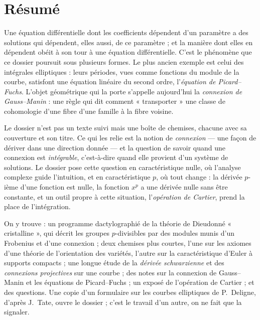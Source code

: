 \documentclass[11pt,a4paper]{article}
\begin{document}
\section*{Résumé}

\begin{resume}
Une équation différentielle dont les coefficients dépendent d'un paramètre a
des solutions qui dépendent, elles aussi, de ce paramètre ; et la manière dont
elles en dépendent obéit à son tour à une équation différentielle. C'est le
phénomène que ce dossier poursuit sous plusieurs formes. Le plus ancien
exemple est celui des intégrales elliptiques : leurs périodes, vues comme
fonctions du module de la courbe, satisfont une équation linéaire du second
ordre, l'\emph{équation de Picard--Fuchs}. L'objet géométrique qui la porte
s'appelle aujourd'hui la \emph{connexion de Gauss--Manin} : une règle qui dit
comment « transporter » une classe de cohomologie d'une fibre d'une famille à
la fibre voisine.

Le dossier n'est pas un texte suivi mais une boîte de chemises, chacune avec
sa couverture et son titre. Ce qui les relie est la notion de
\emph{connexion} — une façon de dériver dans une direction donnée — et la
question de savoir quand une connexion est \emph{intégrable}, c'est-à-dire
quand elle provient d'un système de solutions. Le dossier pose cette question
en caractéristique nulle, où l'analyse complexe guide l'intuition, et en
caractéristique $p$, où tout change : la dérivée $p$-ième d'une fonction est
nulle, la fonction $x^p$ a une dérivée nulle sans être constante, et un
outil propre à cette situation, l'\emph{opération de Cartier}, prend la place
de l'intégration.

On y trouve : un programme dactylographié de la
théorie de Dieudonné « cristalline », qui décrit les groupes $p$-divisibles
par des modules munis d'un Frobenius et d'une connexion ; deux chemises plus
courtes, l'une sur les axiomes d'une théorie de l'orientation des variétés,
l'autre sur la caractéristique d'Euler à supports compacts ; une longue étude
de la \emph{dérivée schwarzienne} et des \emph{connexions projectives} sur une
courbe ; des notes sur la connexion de Gauss--Manin et les équations de
Picard--Fuchs ; un exposé de l'opération de Cartier ; et des questions. Une
copie d'un formulaire sur les courbes elliptiques de P.~Deligne, d'après
J.~Tate, ouvre le dossier ; c'est le travail d'un autre, on ne fait que la
signaler.


\end{resume}
\end{document}
